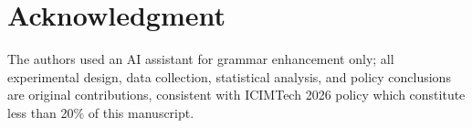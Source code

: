 \documentclass[conference]{IEEEtran}
\begin{document}
\section*{Acknowledgment}

The authors used an AI assistant for grammar enhancement only; all experimental design, data collection, statistical analysis, and policy conclusions are original contributions, consistent with ICIMTech 2026 policy which constitute less than 20\% of this manuscript.

\end{document}
